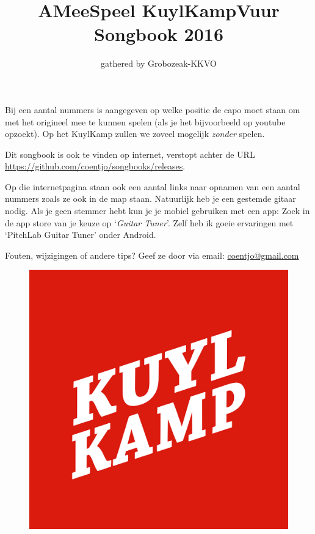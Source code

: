 \documentclass[a4,openany,landscape,tikz]{article}
\title{AMeeSpeel KuylKampVuur Songbook 2016}
\author{gathered by Grobozeak-KKVO}
\begin{document}

\maketitle 



 
\begin{figure}

\end{figure}


Bij een aantal nummers is aangegeven op welke positie de capo moet staan om met het origineel mee te kunnen spelen (als je het bijvoorbeeld op youtube opzoekt). Op het KuylKamp zullen we zoveel mogelijk \emph{zonder} spelen.  

Dit songbook is ook te vinden op internet, verstopt achter de URL \url{https://github.com/coentjo/songbooks/releases}. 

Op die internetpagina staan ook een aantal links naar opnamen van een aantal nummers zoals ze ook in de map staan.  
Natuurlijk heb je een gestemde gitaar nodig. Als je geen stemmer hebt kun je je mobiel gebruiken met een app: Zoek in de app store van je keuze op `\emph{Guitar Tuner}'. Zelf heb ik goeie ervaringen met `PitchLab Guitar Tuner' onder Android. 

Fouten, wijzigingen of andere tips? Geef ze door via email:   \href{mailto:coentjo@gmail.com}{coentjo@gmail.com} 

\begin{figure}
\includegraphics[width=0.3\linewidth]{KK/KuylKamp_vierkantje_logo} 
\end{figure}
\end{document}
